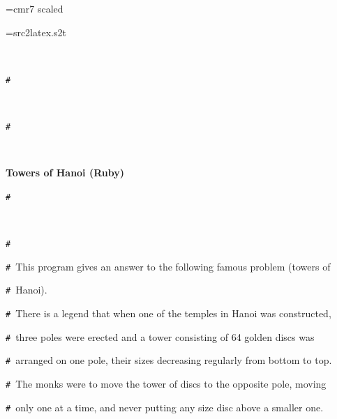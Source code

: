 \documentclass{article}
\begin{document}
\ifx\sevenrm\undefined
  \font\sevenrm=cmr7 scaled 
\fi

\newread\MyStyle
\openin\MyStyle=src2latex.s2t
\ifeof\MyStyle
  \closein\MyStyle
\else
  
  \closein\MyStyle
\fi

\def\mc{\relax}
\def\gt{\relax}
\def\sc{\scshape}

\tt\mc 

\noindent
\rm\mc {\tt\#}\  \hrulefill  \rm\mc 

\noindent
\mbox{}{\tt\#}
\tt\mc 

\noindent
\mbox{}\rm\mc {\tt\#}\  {}%

\noindent
\mbox{}{\tt\#}
\tt\mc 

\noindent
\mbox{}\rm\mc {\tt\#}\  {}\centerline{\bf Towers of Hanoi (Ruby)}  \rm\mc 

\noindent
\mbox{}{\tt\#}
\tt\mc 

\noindent
\mbox{}\rm\mc {\tt\#}\  {}  \rm\mc 

\noindent
\mbox{}{\tt\#}\  {}\hspace{\leftmargini}\noindent  \rm\mc 

\noindent
\mbox{}{\tt\#}\  {}\hspace{\leftmargini}This program gives an answer to the following famous problem (towers of  \rm\mc 

\noindent
\mbox{}{\tt\#}\  {}\hspace{\leftmargini}Hanoi).  \rm\mc 

\noindent
\mbox{}{\tt\#}\  {}\hspace{\leftmargini}There is a legend that when one of the temples in Hanoi was constructed,  \rm\mc 

\noindent
\mbox{}{\tt\#}\  {}\hspace{\leftmargini}three poles were erected and a tower consisting of 64 golden discs was  \rm\mc 

\noindent
\mbox{}{\tt\#}\  {}\hspace{\leftmargini}arranged on one pole, their sizes decreasing regularly from bottom to top.  \rm\mc 

\noindent
\mbox{}{\tt\#}\  {}\hspace{\leftmargini}The monks were to move the tower of discs to the opposite pole, moving  \rm\mc 

\noindent
\mbox{}{\tt\#}\  {}\hspace{\leftmargini}only one at a time, and never putting any size disc above a smaller one.  \rm\mc 
\end{document}
